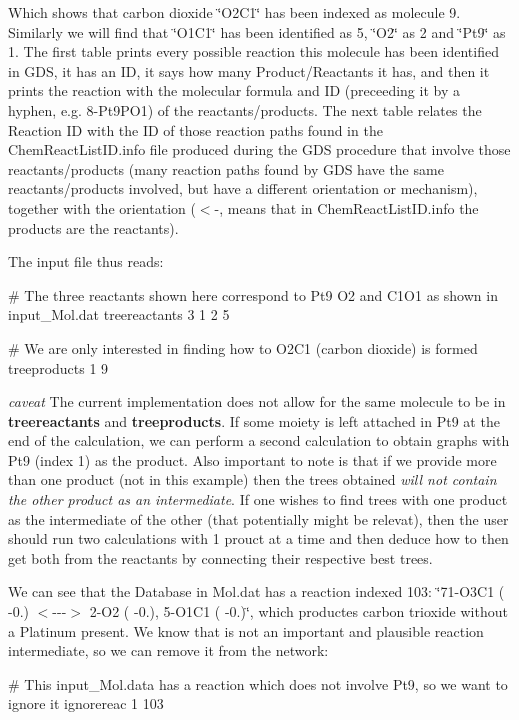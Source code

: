 Which shows that carbon dioxide \char`\"{}\+O2\+C1\char`\"{} has been indexed as molecule 9. Similarly we will find that \char`\"{}\+O1\+C1\char`\"{} has been identified as 5, \char`\"{}\+O2\char`\"{} as 2 and \char`\"{}\+Pt9\char`\"{} as 1. The first table prints every possible reaction this molecule has been identified in G\+DS, it has an ID, it says how many Product/\+Reactants it has, and then it prints the reaction with the molecular formula and ID (preceeding it by a hyphen, e.\+g. 8-\/\+Pt9\+P\+O1) of the reactants/products. The next table relates the Reaction ID with the ID of those reaction paths found in the Chem\+React\+List\+I\+D.\+info file produced during the G\+DS procedure that involve those reactants/products (many reaction paths found by G\+DS have the same reactants/products involved, but have a different orientation or mechanism), together with the orientation ($<$-\/, means that in Chem\+React\+List\+I\+D.\+info the products are the reactants).

The input file thus reads\+: \begin{DoxyVerb}#  The three reactants shown here correspond to Pt9 O2 and C1O1 as shown in input_Mol.dat
treereactants 3
1 2 5

#  We are only interested in finding how to O2C1 (carbon dioxide) is formed
treeproducts 1
9 
\end{DoxyVerb}


{\itshape caveat} The current implementation does not allow for the same molecule to be in {\bfseries treereactants} and {\bfseries treeproducts}. If some moiety is left attached in Pt9 at the end of the calculation, we can perform a second calculation to obtain graphs with Pt9 (index 1) as the product. Also important to note is that if we provide more than one product (not in this example) then the trees obtained {\itshape will not contain the other product as an intermediate}. If one wishes to find trees with one product as the intermediate of the other (that potentially might be relevat), then the user should run two calculations with 1 prouct at a time and then deduce how to then get both from the reactants by connecting their respective best trees.

We can see that the Database in Mol.\+dat has a reaction indexed 103\+: \char`\"{}71-\/\+O3\+C1 ( -\/0.)  $<$-\/-\/-\/$>$    2-\/\+O2 ( -\/0.),    5-\/\+O1\+C1 ( -\/0.)\char`\"{}, which productes carbon trioxide without a Platinum present. We know that is not an important and plausible reaction intermediate, so we can remove it from the network\+: \begin{DoxyVerb}#  This input_Mol.data has a reaction which does not involve Pt9, so we want to ignore it
ignorereac 1
103
\end{DoxyVerb}


